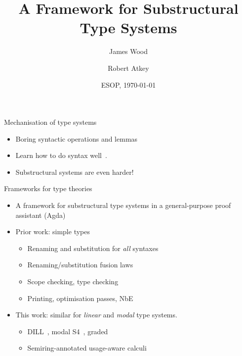 \documentclass[fleqn]{beamer}
\title{A Framework for Substructural Type Systems}
\author{James Wood\inst{1} \and Robert Atkey\inst{1}}
\institute{\inst{1}University of Strathclyde}
\date{ESOP, \today}
\begin{document}
\frame{\titlepage}

\begin{frame}{Mechanisation of type systems}
  \begin{itemize}
    \item Boring syntactic operations and lemmas
    \item Learn how to do syntax well~\cite{AR99,McBride05,bhkm12}.
    \item Substructural systems are even harder!
  \end{itemize}
\end{frame}

\begin{frame}{Frameworks for type theories}
  \begin{itemize}
    \item A framework for substructural type systems in a general-purpose proof assistant (Agda)
    \item Prior work: simple types~\cite{AACMM21}
      \begin{itemize}
        \item Renaming and substitution for \emph{all} syntaxes
        \item Renaming/substitution fusion laws
        \item Scope checking, type checking
        \item Printing, optimisation passes, NbE
      \end{itemize}
    \item This work: similar for \emph{linear} and \emph{modal} type systems.
      \begin{itemize}
        \item DILL~\cite{Barber1996}, modal S4~\cite{judgmental}, graded~\cite{Granule18}
        \item Semiring-annotated usage-aware calculi
      \end{itemize}
  \end{itemize}
\end{frame}
\end{document}
